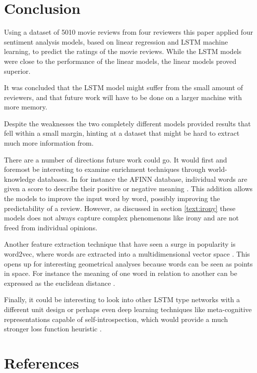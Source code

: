 \documentclass[a4paper]{article}
\begin{document}
\section{Conclusion}
Using a dataset of 5010 movie reviews from four reviewers this paper applied
four sentiment analysis models, based on linear regression and LSTM
machine learning, to predict the ratings of the movie reviews.
While the LSTM models were close to the performance of the linear models,
the linear models proved superior.

It was concluded that the LSTM model might suffer from the small amount of
reviewers, and that future work will have to be done on a larger machine with
more memory.

Despite the weaknesses the two completely different models provided results
that fell within a small margin, hinting at a dataset that might be hard to
extract much more information from.

There are a number of directions future work could go. It would first and
foremost be interesting to examine enrichment techniques through world-knowledge
databases. In for instance the AFINN database, individual words are given a
score to describe their positive or negative meaning \citep{IMM2011-06010}.
This addition allows the models to improve the input word by word, possibly
improving the predictability of a review. However, as discussed in section
\ref{text:irony} these models does not always capture complex phenomenons like
irony and are not freed from individual opinions.

Another feature extraction technique that have seen a surge in popularity is
word2vec, where words are extracted into a multidimensional vector space
\citep{Schmidhuber2015}.
This opens up for interesting geometrical analyses because words can be seen as
points in space. For instance the meaning of one word in relation to another
can be expressed as the euclidean distance \citep{Russell2014, Schmidhuber2015}.

Finally, it could be interesting to look into other LSTM type networks
with a different unit design \citep{Schmidhuber2015} or perhaps even deep
learning techniques like meta-cognitive representations capable of
self-introspection, which would provide a much stronger loss function heuristic
\citep{Cox2005}.

\clearpage
\renewcommand*{\refname}{}
\section{References}
\end{document}
